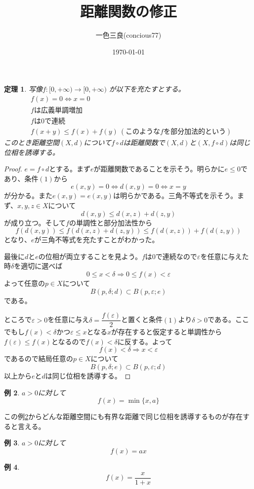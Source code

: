 \documentclass[leqno]{jsarticle}
\title{距離関数の修正}
\author{一色三良(concious77)}
\date{\today}
\newtheorem{thm}{定理}
\newtheorem{exam}[thm]{例}
\newcommand{\To}{\Longrightarrow}
\newcommand{\mgn}{\infty}
\newcommand{\ep}{\varepsilon}
\newcommand{\de}{\delta}
\begin{document}
\maketitle

\begin{thm}\label{sub}
写像$f:[0,+\mgn)\to [0,+\mgn)$
が以下を充たすとする。
\begin{align}
&f(x)=0\iff x=0\\
&\text{$f$は広義単調増加}\\
&\text{$f$は$0$で連続}\\
&f(x+y)\le f(x)+f(y)\ (\text{このような$f$を部分加法的という})
\end{align}
このとき距離空間$(X,d)$について$f\circ d$は距離関数で$(X,d)$と$(X,f\circ d)$は同じ位相を誘導する。
\end{thm}
\begin{proof}
$e=f\circ d$とする。まず$e$が距離関数であることを示そう。明らかに$e\le 0$であり、条件$(1)$から
\[
e(x,y)=0\iff d(x,y)=0\iff x=y
\]
が分かる。また$e(x,y)=e(x,y)$は明らかである。三角不等式を示そう。まず、$x,y,z\in X$について
\[
d(x,y)\le d(x,z)+d(z,y)
\]
が成り立つ。そして$f$の単調性と部分加法性から
\[
f(d(x,y))\le f(d(x,z)+d(z,y))\le f(d(x,z))+f(d(z,y))
\]
となり、$e$が三角不等式を充たすことがわかった。\par
最後に$d$と$e$の位相が両立することを見よう。$f$は$0$で連続なので$\ep$を任意に与えた時$\de$を適切に選べば
\[
0\le x< \de\To 0\le f(x)<\ep
\]
よって任意の$p\in X$について
\[
B(p,\de;d)\subset B(p,\ep;e)
\]
である。\par
ところで$\ep>0$を任意に与え$\de =\dfrac{f(\ep)}{2}$と置くと条件$(1)$より$\de>0$である。ここでもし$f(x)<\de$かつ$\ep\le x$となる$x$が存在すると仮定すると単調性から$f(\ep)\le f(x)$となるので$f(x)<\de$に反する。よって
\[
f(x)<\de\To x<\ep
\]
であるので結局任意の$p\in X$について
\[
B(p,\de;e)\subset B(p,\ep;d)
\]
以上から$e$と$d$は同じ位相を誘導する。
\end{proof}

\begin{exam}\label{a}
$a>0$に対して
\[
f(x)=\min\{x,a\}
\]
\end{exam}
この例\ref{a}からどんな距離空間にも有界な距離で同じ位相を誘導するものが存在すると言える。

\begin{exam}
$a>0$に対して
\[
f(x)=ax
\]
\end{exam}


\begin{exam}
\[
f(x)=\frac{x}{1+x}
\]
\end{exam}
\end{document}
